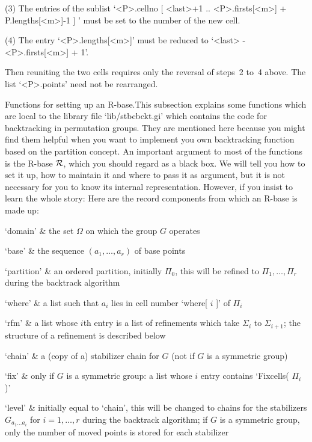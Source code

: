 (3) The entries of the sublist `<P>.cellno{ [ <last>+1 .. <P>.firsts[<m>]
+ P.lengths[<m>]-1 ] }' must be set to the number of the new cell.

(4) The entry    `<P>.lengths[<m>]'  must   be  reduced  to   `<last>   -
<P>.firsts[<m>] + 1'.

Then reuniting the  two cells requires  only the reversal of steps~2 to~4
above. The list `<P>.points' need not be rearranged.

\medskip
{\bsf Functions for setting up  an R-base.}\quad This subsection explains
some  {\GAP}  functions   which   are   local   to   the   library   file
`lib/stbcbckt.gi' which contains the code for backtracking in permutation
groups. They are mentioned here because you might find them helpful  when
you want  to  implement  you  own  backtracking  function  based  on  the
partition concept. An important argument to most of the functions is  the
R-base ${\cal R}$, which you should regard as a black box. We will tell you how
to set it up, how to maintain it and where to pass it as argument, but it
is not necessary for you to know its internal representation. However, if
you insist to learn the whole story: Here are the record components  from
which an R-base is made up:

\beginitems
`domain' &
    the set $\Omega$ on which the group $G$ operates

`base' &
    the sequence $(a_1,\ldots,a_r)$ of base points

`partition' &
    an  ordered  partition, initially  $\Pi_0$, this  will be  refined to
    $\Pi_1,\ldots,\Pi_r$ during the backtrack algorithm

`where' &
    a list such that $a_i$ lies in cell number `where[ $i$ ]' of $\Pi_i$

`rfm' &
    a    list whose $i$th entry  is   a  list of   refinements which take
    $\Sigma_i$  to $\Sigma_{i+1}$;  the    structure of a  refinement  is
    described below

`chain' &
    a (copy of a) stabilizer  chain for $G$ (not  if  $G$ is a  symmetric
    group)

`fix' &
    only if  $G$ is a  symmetric group:  a list whose  $i$ entry contains
    `Fixcells( $\Pi_i$ )'

`level' &
    initially equal to `chain',  this will be changed  to chains  for the
    stabilizers  $G_{a_1\dots  a_i}$    for  $i=1,\ldots,r$  during   the
    backtrack algorithm; if $G$ is a  symmetric group, only the number of
    moved points is stored for each stabilizer

